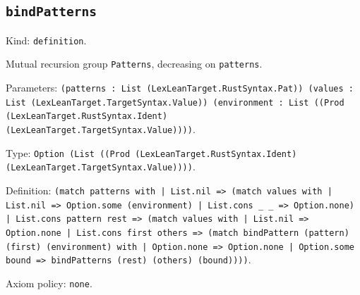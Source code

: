 \documentclass[11pt]{article}
\begin{document}
\subsection*{\texttt{bindPatterns}}
\noindent Kind: \texttt{definition}.\par
\noindent Mutual recursion group \texttt{Patterns}, decreasing on \texttt{patterns}.\par
\noindent Parameters: \texttt{(patterns : List (LexLeanTarget.RustSyntax.Pat)) (values : List (LexLeanTarget.TargetSyntax.Value)) (environment : List ((Prod (LexLeanTarget.RustSyntax.Ident) (LexLeanTarget.TargetSyntax.Value))))}.\par
\noindent Type: \texttt{Option (List ((Prod (LexLeanTarget.RustSyntax.Ident) (LexLeanTarget.TargetSyntax.Value))))}.\par
\noindent Definition: \texttt{(match patterns with | List.nil => (match values with | List.nil => Option.some (environment) | List.cons \_ \_ => Option.none) | List.cons pattern rest => (match values with | List.nil => Option.none | List.cons first others => (match bindPattern (pattern) (first) (environment) with | Option.none => Option.none | Option.some bound => bindPatterns (rest) (others) (bound))))}.\par
\noindent Axiom policy: \texttt{none}.\par
\end{document}
